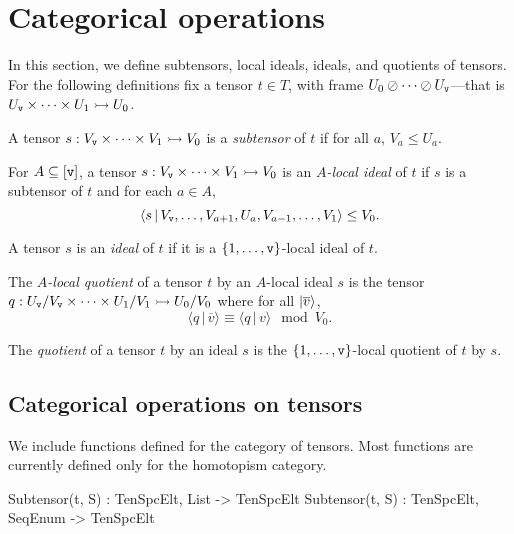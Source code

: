 \section{Categorical operations}

In this section, we define subtensors, local ideals, ideals, and quotients of
tensors. For the following definitions fix a tensor $t\in T$, with frame
$U_0\oslash \cdots\oslash U_{\operatorname{\mathtt{v}}}$---that is $U_{\operatorname{\mathtt{v}}}\times\cdots\times
U_1\rightarrowtail U_0$. 
\begin{defn}
A tensor $s:V_{\operatorname{\mathtt{v}}}\times \cdots\times V_1\rightarrowtail V_0$ is a
\emph{subtensor} of $t$ if for all $a$, $V_a\leq U_a$.
\end{defn}

\begin{defn}
For $A\subseteq [\operatorname{\mathtt{v}}]$, a tensor $s:V_{\operatorname{\mathtt{v}}}\times \cdots\times
V_1\rightarrowtail V_0$ is an \emph{$A$-local ideal} of $t$ if $s$ is a
subtensor of $t$ and for each $a\in A$, 
\[ \langle s \,|\, V_{\operatorname{\mathtt{v}}},\dots, V_{a+1}, U_a, V_{a-1},\dots, V_1\rangle \leq V_0 .\]
\end{defn}

\begin{defn}
A tensor $s$ is an \emph{ideal} of $t$ if it is a $\{1,\dots,\operatorname{\mathtt{v}}\}$-local ideal of $t$. 
\end{defn}

\begin{defn}
The \emph{$A$-local quotient} of a tensor $t$ by an $A$-local ideal $s$ is the
tensor $q:U_{\operatorname{\mathtt{v}}}/V_{\operatorname{\mathtt{v}}} \times \cdots \times U_1/V_1\rightarrowtail U_0/V_0$
where for all $| \overline{v}\rangle$,
\[ \langle q \,|\, \overline{v}\rangle \equiv \langle q \,|\, v\rangle \mod V_0. \]
\end{defn}

\begin{defn}
The \emph{quotient} of a tensor $t$ by an ideal $s$ is the $\{1,\dots,\operatorname{\mathtt{v}}\}$-local quotient of $t$ by $s$.
\end{defn}

\subsection{Categorical operations on tensors}

We include functions defined for the category of tensors.
Most functions are currently defined only for the homotopism category.

\begin{intrinsics}
Subtensor(t, S) : TenSpcElt, List -> TenSpcElt
Subtensor(t, S) : TenSpcElt, SeqEnum -> TenSpcElt
\end{intrinsics}

